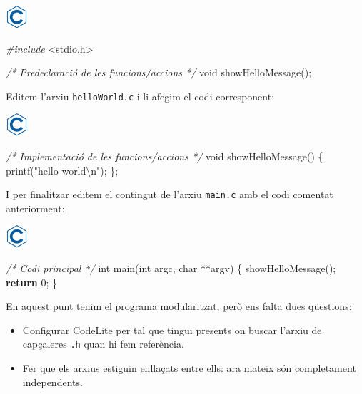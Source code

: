 \documentclass[
]{book}
\newenvironment{Shaded}{\begin{snugshade}}{\end{snugshade}}
\newcommand{\CommentTok}[1]{\textcolor[rgb]{0.56,0.35,0.01}{\textit{#1}}}
\newcommand{\ControlFlowTok}[1]{\textcolor[rgb]{0.13,0.29,0.53}{\textbf{#1}}}
\newcommand{\DataTypeTok}[1]{\textcolor[rgb]{0.13,0.29,0.53}{#1}}
\newcommand{\DecValTok}[1]{\textcolor[rgb]{0.00,0.00,0.81}{#1}}
\newcommand{\ImportTok}[1]{#1}
\newcommand{\NormalTok}[1]{#1}
\newcommand{\PreprocessorTok}[1]{\textcolor[rgb]{0.56,0.35,0.01}{\textit{#1}}}
\newcommand{\SpecialCharTok}[1]{\textcolor[rgb]{0.00,0.00,0.00}{#1}}
\newcommand{\StringTok}[1]{\textcolor[rgb]{0.31,0.60,0.02}{#1}}
\providecommand{\tightlist}{%
  \setlength{\itemsep}{0pt}\setlength{\parskip}{0pt}}
\begin{document}
\includegraphics{./img/c.png}

\begin{Shaded}
\begin{Highlighting}[]
\PreprocessorTok{\#include }\ImportTok{\textless{}stdio.h\textgreater{}}

\CommentTok{/* Predeclaració de les funcions/accions */}
\DataTypeTok{void}\NormalTok{ showHelloMessage();}
\end{Highlighting}
\end{Shaded}

Editem l'arxiu \texttt{helloWorld.c} i li afegim el codi corresponent:

\includegraphics{./img/c.png}

\begin{Shaded}
\begin{Highlighting}[]
\CommentTok{/* Implementació de les funcions/accions */}
\DataTypeTok{void}\NormalTok{ showHelloMessage() \{}
\NormalTok{    printf(}\StringTok{"hello world}\SpecialCharTok{\textbackslash{}n}\StringTok{"}\NormalTok{);}
\NormalTok{\};}
\end{Highlighting}
\end{Shaded}

I per finalitzar editem el contingut de l'arxiu \texttt{main.c} amb el codi comentat anteriorment:

\includegraphics{./img/c.png}

\begin{Shaded}
\begin{Highlighting}[]
\CommentTok{/* Codi principal */}
\DataTypeTok{int}\NormalTok{ main(}\DataTypeTok{int}\NormalTok{ argc, }\DataTypeTok{char}\NormalTok{ **argv) \{}
\NormalTok{    showHelloMessage();}
    \ControlFlowTok{return} \DecValTok{0}\NormalTok{;}
\NormalTok{\}}
\end{Highlighting}
\end{Shaded}

En aquest punt tenim el programa modularitzat, però ens falta dues qüestions:

\begin{itemize}
\tightlist
\item
  Configurar CodeLite per tal que tingui presents on buscar l'arxiu de capçaleres \texttt{.h} quan hi fem referència.
\item
  Fer que els arxius estiguin enllaçats entre ells: ara mateix són completament independents.
\end{itemize}
\end{document}
